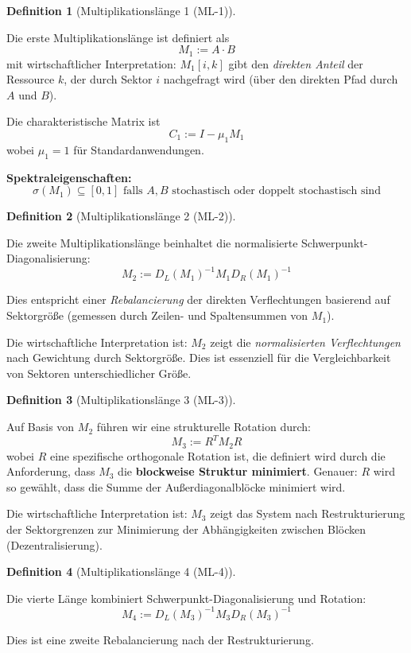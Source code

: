 \documentclass[a4paper,12pt]{article}
\theoremstyle{definition}
\newtheorem{definition}{Definition}
\begin{document}
\begin{definition}[Multiplikationslänge 1 (ML-1)]
\label{def:ml1}

Die erste Multiplikationslänge ist definiert als
\[
M_1 := A \cdot B
\]
mit wirtschaftlicher Interpretation: $M_1[i,k]$ gibt den \emph{direkten Anteil} der Ressource $k$, der durch Sektor $i$ nachgefragt wird (über den direkten Pfad durch $A$ und $B$).

Die charakteristische Matrix ist
\[
C_1 := I - \mu_1 M_1
\]
wobei $\mu_1 = 1$ für Standardanwendungen.

\textbf{Spektraleigenschaften:} 
\[
\sigma(M_1) \subseteq [0, 1] \text{ falls } A, B \text{ stochastisch oder doppelt stochastisch sind}
\]
\end{definition}

\begin{definition}[Multiplikationslänge 2 (ML-2)]
\label{def:ml2}

Die zweite Multiplikationslänge beinhaltet die normalisierte Schwerpunkt-Diagonalisierung:
\[
M_2 := D_L(M_1)^{-1} M_1 D_R(M_1)^{-1}
\]

Dies entspricht einer \emph{Rebalancierung} der direkten Verflechtungen basierend auf Sektorgröße (gemessen durch Zeilen- und Spaltensummen von $M_1$).

Die wirtschaftliche Interpretation ist: $M_2$ zeigt die \emph{normalisierten Verflechtungen} nach Gewichtung durch Sektorgröße. Dies ist essenziell für die Vergleichbarkeit von Sektoren unterschiedlicher Größe.

\end{definition}

\begin{definition}[Multiplikationslänge 3 (ML-3)]
\label{def:ml3}

Auf Basis von $M_2$ führen wir eine strukturelle Rotation durch:
\[
M_3 := R^T M_2 R
\]
wobei $R$ eine spezifische orthogonale Rotation ist, die definiert wird durch die Anforderung, dass $M_3$ die \textbf{blockweise Struktur minimiert}. Genauer: $R$ wird so gewählt, dass die Summe der Außerdiagonalblöcke minimiert wird.

Die wirtschaftliche Interpretation ist: $M_3$ zeigt das System nach Restrukturierung der Sektorgrenzen zur Minimierung der Abhängigkeiten zwischen Blöcken (Dezentralisierung).

\end{definition}

\begin{definition}[Multiplikationslänge 4 (ML-4)]
\label{def:ml4}

Die vierte Länge kombiniert Schwerpunkt-Diagonalisierung und Rotation:
\[
M_4 := D_L(M_3)^{-1} M_3 D_R(M_3)^{-1}
\]

Dies ist eine zweite Rebalancierung nach der Restrukturierung.
\end{definition}
\end{document}
